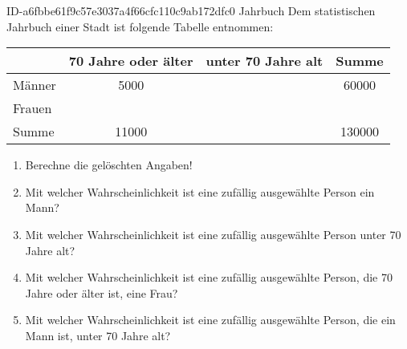 \begin{exercise}
      {ID-a6fbbe61f9c57e3037a4f66cfc110c9ab172dfc0}
      {Jahrbuch}
  \ifproblem\problem
    Dem statistischen Jahrbuch einer Stadt ist folgende Tabelle entnommen:
    \begin{center}
      \begin{tabular}{|l|c|c|c|}
        \hline
               & 70 Jahre oder älter & unter 70 Jahre alt & Summe        \\
        \hline
        Männer & \num{5000}          &                    & \num{60000}  \\
        \hline
        Frauen &                     &                    &              \\
        \hline
        Summe  & \num{11000}         &                    & \num{130000} \\
        \hline
      \end{tabular}
    \end{center}
    \begin{enumerate}
      \item Berechne die gelöschten Angaben!
      \item Mit welcher Wahrscheinlichkeit ist eine zufällig ausgewählte
            Person ein Mann?
      \item Mit welcher Wahrscheinlichkeit ist eine zufällig ausgewählte
            Person unter 70 Jahre alt?
      \item Mit welcher Wahrscheinlichkeit ist eine zufällig ausgewählte
            Person, die 70 Jahre oder älter ist, eine Frau?
      \item Mit welcher Wahrscheinlichkeit ist eine zufällig ausgewählte
            Person, die ein Mann ist, unter 70 Jahre alt?
    \end{enumerate}
  \fi
\end{exercise}
